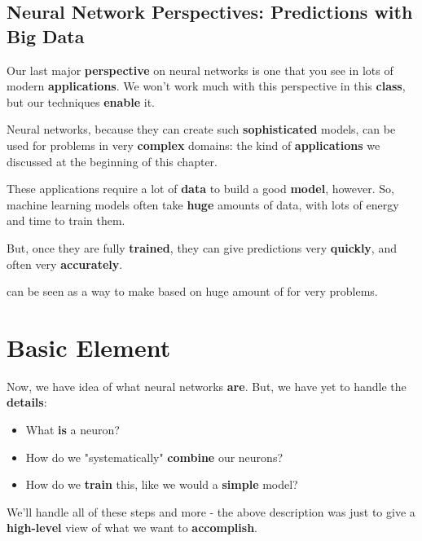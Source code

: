     \subsection{Neural Network Perspectives: Predictions with Big Data}
    
        Our last major \textbf{perspective} on neural networks is one that you see in lots of modern \textbf{applications}. We won't work much with this perspective in this \textbf{class}, but our techniques \textbf{enable} it.
        
        Neural networks, because they can create such \textbf{sophisticated} models, can be used for problems in very \textbf{complex} domains: the kind of \textbf{applications} we discussed at the beginning of this chapter.
        
        These applications require a lot of \textbf{data} to build a good \textbf{model}, however. So, machine learning models often take \textbf{huge} amounts of data, with lots of energy and time to train them.
        
        But, once they are fully \textbf{trained}, they can give predictions very \textbf{quickly}, and often very \textbf{accurately}.\\
        
        \begin{concept}
             can be seen as a way to make  based on huge amount of  for very  problems.
        \end{concept}
        

\section{Basic Element}

    Now, we have idea of what neural networks \textbf{are}. But, we have yet to handle the \textbf{details}:
    
    \begin{itemize}
        \item What \textbf{is} a neuron?
        \item How do we "systematically" \textbf{combine} our neurons?
        \item How do we \textbf{train} this, like we would a \textbf{simple} model?
    \end{itemize}
    
    We'll handle all of these steps and more - the above description was just to give a \textbf{high-level} view of what we want to \textbf{accomplish}. 
    
